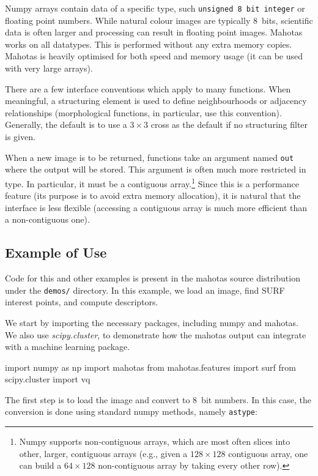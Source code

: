 \documentclass{scrartcl}
\let\code\texttt
\begin{document}
Numpy arrays contain data of a specific type, such \code{unsigned 8 bit
integer} or floating point numbers. While natural colour images are typically
8~bits, scientific data is often larger and processing can result in floating
point images. Mahotas works on all datatypes. This is performed without any
extra memory copies. Mahotas is heavily optimised for both speed and memory
usage (it can be used with very large arrays).

There are a few interface conventions which apply to many functions. When
meaningful, a structuring element is used to define neighbourhoods or adjacency
relationships (morphological functions, in particular, use this convention).
Generally, the default is to use a $3 \times 3$ cross as the default if no
structuring filter is given.

When a new image is to be returned, functions take an argument named \code{out}
where the output will be stored. This argument is often much more restricted in
type. In particular, it must be a contiguous array.\footnote{Numpy supports
non-contiguous arrays, which are most often slices into other, larger,
contiguous arrays (e.g., given a $128 \times 128$ contiguous array, one can
build a $64 \times 128$ non-contiguous array by taking every other row).} Since
this is a performance feature (its purpose is to avoid extra memory
allocation), it is natural that the interface is less flexible (accessing a
contiguous array is much more efficient than a non-contiguous one).

\subsection{Example of Use}

Code for this and other examples is present in the mahotas source distribution
under the \texttt{demos/} directory. In this example, we load an image, find
SURF interest points, and compute descriptors.

We start by importing the necessary packages, including numpy and mahotas. We
also use \textit{scipy.cluster}, to demonstrate how the mahotas output can integrate
with a machine learning package.

\begin{python}
import numpy as np
import mahotas
from mahotas.features import surf
from scipy.cluster import vq
\end{python}

The first step is to load the image and convert to 8~bit numbers. In this
case, the conversion is done using standard numpy methods, namely
\code{astype}:
\end{document}
